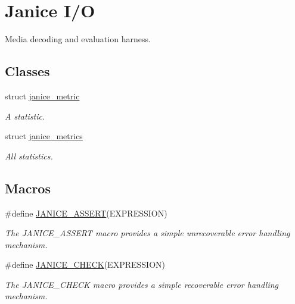 \hypertarget{group__janice__io}{}\section{Janice I/\+O}
\label{group__janice__io}


Media decoding and evaluation harness.  


\subsection*{Classes}
\begin{DoxyCompactItemize}
\item 
struct \hyperlink{structjanice__metric}{janice\+\_\+metric}
\begin{DoxyCompactList}\small\item\em A statistic. \end{DoxyCompactList}\item 
struct \hyperlink{structjanice__metrics}{janice\+\_\+metrics}
\begin{DoxyCompactList}\small\item\em All statistics. \end{DoxyCompactList}\end{DoxyCompactItemize}
\subsection*{Macros}
\begin{DoxyCompactItemize}
\item 
\#define \hyperlink{group__janice__io_ga39a97708cd80add78fa1fccf8b23c6f3}{J\+A\+N\+I\+C\+E\+\_\+\+A\+S\+S\+E\+R\+T}(E\+X\+P\+R\+E\+S\+S\+I\+O\+N)                                                                      
\begin{DoxyCompactList}\small\item\em The {\ttfamily J\+A\+N\+I\+C\+E\+\_\+\+A\+S\+S\+E\+R\+T} macro provides a simple unrecoverable error handling mechanism. \end{DoxyCompactList}\item 
\#define \hyperlink{group__janice__io_ga2d8bd9514bf7749699990e03827a2a07}{J\+A\+N\+I\+C\+E\+\_\+\+C\+H\+E\+C\+K}(E\+X\+P\+R\+E\+S\+S\+I\+O\+N)                      
\begin{DoxyCompactList}\small\item\em The {\ttfamily J\+A\+N\+I\+C\+E\+\_\+\+C\+H\+E\+C\+K} macro provides a simple recoverable error handling mechanism. \end{DoxyCompactList}\end{DoxyCompactItemize}
